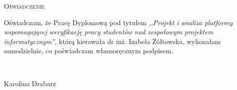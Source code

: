 \newpage
\thispagestyle{empty}


\begin{center}
\LARGE\textsc{Oświadczenie}
\end{center}

\vspace{1cm}

Oświadczam, że Pracę Dyplomową pod tytułem \emph{,,Projekt i analiza platformy wspomagającej weryfikację pracy studentów nad zespołowym projektem informatycznym''}, którą kierowała dr inż. Izabela Żółtowska, wykonałam samodzielnie, co poświadczam własnoręcznym podpisem.

\vspace{2cm}

\begin{flushright}
\begin{minipage}{5cm}
	\dotfill \\[-0.7cm]
	\begin{center}
	\small{Karolina Drabarz}
	\end{center}
\end{minipage}
\end{flushright}

\cleardoublepage
